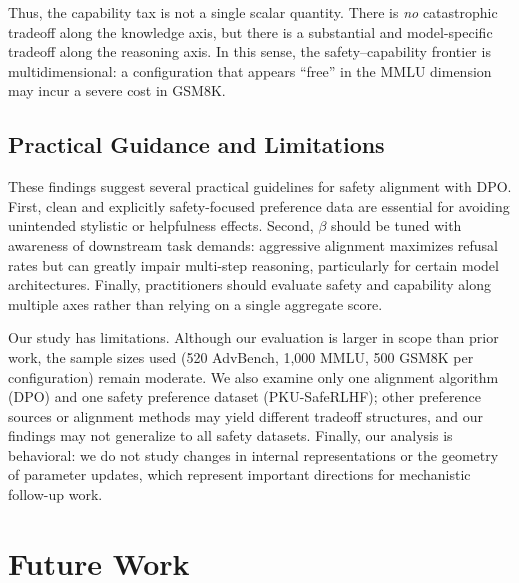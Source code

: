 \documentclass[a4paper, twocolumn, 9pt]{article}
\begin{document}
Thus, the capability tax is not a single scalar quantity.
There is \emph{no} catastrophic tradeoff along the knowledge axis, but there is a
substantial and model-specific tradeoff along the reasoning axis.
In this sense, the safety--capability frontier is multidimensional: a configuration
that appears ``free'' in the MMLU dimension may incur a severe cost in GSM8K.

\subsection{Practical Guidance and Limitations}

These findings suggest several practical guidelines for safety alignment with DPO.
First, clean and explicitly safety-focused preference data are essential for avoiding
unintended stylistic or helpfulness effects.
Second, $\beta$ should be tuned with awareness of downstream task demands:
aggressive alignment maximizes refusal rates but can greatly impair multi-step
reasoning, particularly for certain model architectures.
Finally, practitioners should evaluate safety and capability along multiple axes
rather than relying on a single aggregate score.

Our study has limitations.
Although our evaluation is larger in scope than prior work, the sample sizes used
(520 AdvBench, 1{,}000 MMLU, 500 GSM8K per configuration) remain moderate.
We also examine only one alignment algorithm (DPO) and one safety preference
dataset (PKU-SafeRLHF); other preference sources or alignment methods may yield different
tradeoff structures, and our findings may not generalize to all safety datasets.
Finally, our analysis is behavioral: we do not study changes in internal
representations or the geometry of parameter updates, which represent important
directions for mechanistic follow-up work.

\section{Future Work}
\label{sec:future_work}
\end{document}
